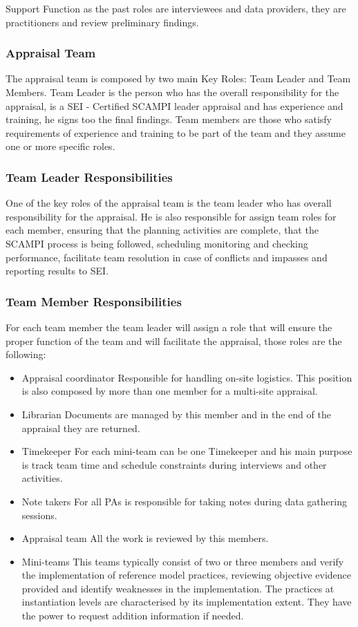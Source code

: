 Support Function as the past roles are interviewees and data providers, they are practitioners and review preliminary findings.

\subsubsection{Appraisal Team}

The appraisal team is composed by two main Key Roles: Team Leader and Team Members.
Team Leader is the person who has the overall responsibility for the appraisal, is a SEI - Certified SCAMPI leader appraisal and has experience and training, he signs too the final findings.
Team members are those who satisfy requirements of  experience and training to be part of the team and they assume one or more specific roles.

\subsubsection{Team Leader Responsibilities}

One of the key roles of the appraisal team is the team leader who has overall responsibility for the appraisal. He is also responsible for assign team roles for each member, ensuring that the planning activities are complete, that the SCAMPI process is being followed, scheduling monitoring and checking performance, facilitate team resolution in case of conflicts and impasses and reporting results to SEI.

\subsubsection{Team Member Responsibilities}
For each team member the team leader will assign a role that will ensure the proper function of the team and will facilitate the appraisal, those roles are the following:
\begin{itemize}
	\item Appraisal coordinator
	\subitem Responsible for handling on-site logistics. This position is also composed by more than one member for a multi-site appraisal.
	\item Librarian
	\subitem Documents are managed by this member and in the end of the appraisal they are returned.
	\item Timekeeper
	\subitem For each mini-team can be one Timekeeper and his main purpose is track team time and schedule constraints during interviews and other activities.
	\item Note takers
	\subitem For all PAs is responsible for taking notes during data gathering sessions.
	\item Appraisal team
	\subitem All the work is reviewed by this members.
	\item Mini-teams
	\subitem This teams typically consist of two or three members and verify the implementation of reference model practices, reviewing objective evidence provided and identify weaknesses in the implementation. The practices at instantiation levels are characterised by its implementation extent. They have the power to request addition information if needed. 
\end{itemize}

